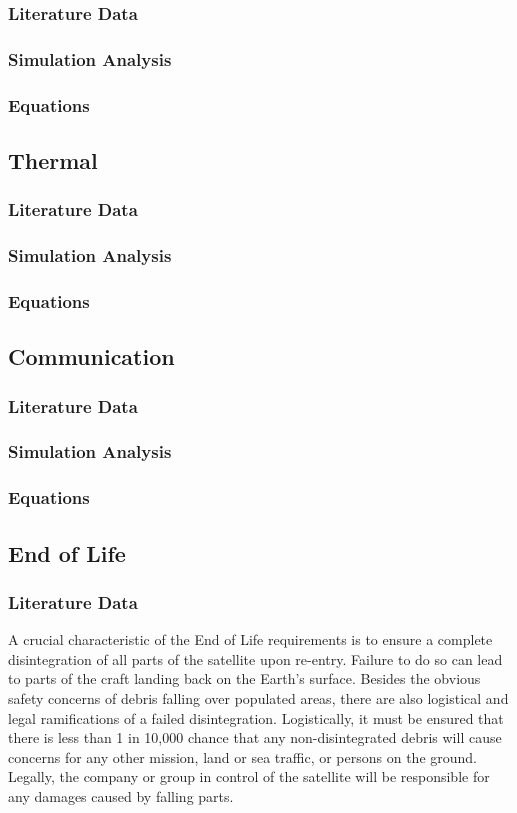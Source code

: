 \documentclass{ece}
\begin{document}
\subsubsection{Literature Data}
\subsubsection{Simulation Analysis}
\subsubsection{Equations}

\subsection{Thermal}
\subsubsection{Literature Data}
\subsubsection{Simulation Analysis}
\subsubsection{Equations}

\subsection{Communication}
\subsubsection{Literature Data}
\subsubsection{Simulation Analysis}
\subsubsection{Equations}

\subsection{End of Life}
\subsubsection{Literature Data}
A crucial characteristic of the End of Life requirements is to ensure a complete disintegration of all parts of the satellite upon re-entry. Failure to do so can lead to parts of the craft landing back on the Earth's surface. Besides the obvious safety concerns of debris falling over populated areas, there are also logistical and legal ramifications of a failed disintegration. Logistically, it must be ensured that there is less than 1 in 10,000 chance that any non-disintegrated debris will cause concerns for any other mission, land or sea traffic, or persons on the ground. Legally, the company or group in control of the satellite will be responsible for any damages caused by falling parts. 
\end{document}
